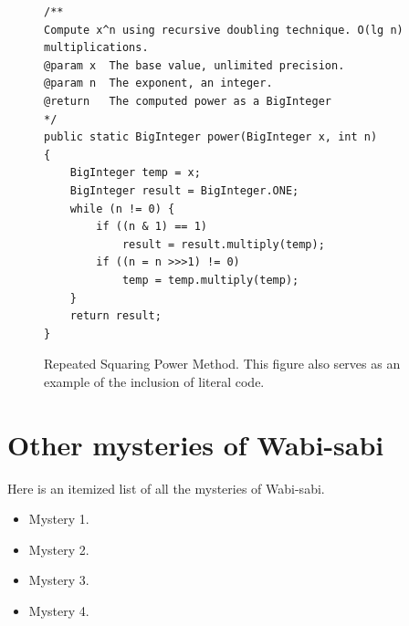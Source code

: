 \documentclass[dissertation, proposal]{bsu-cs}  %
\begin{document}
\begin{figure}[t]

\begin{vcode}  
\begin{lstlisting}
/**
Compute x^n using recursive doubling technique. O(lg n) multiplications.
@param x  The base value, unlimited precision.
@param n  The exponent, an integer.
@return   The computed power as a BigInteger
*/
public static BigInteger power(BigInteger x, int n)
{
    BigInteger temp = x;
    BigInteger result = BigInteger.ONE;
	while (n != 0) {
        if ((n & 1) == 1) 
            result = result.multiply(temp);
		if ((n = n >>>1) != 0)
           	temp = temp.multiply(temp);
    }
    return result;
}
\end{lstlisting}
\end{vcode}
\caption[Repeated Squaring Power Method]{Repeated Squaring Power Method. This figure
also serves as an example of the inclusion of literal code.}
%
\label{fig:code} 
\end{figure}


\section{Other mysteries of Wabi-sabi}

Here is an itemized list of all the mysteries of Wabi-sabi.
\begin{itemize}
\item Mystery 1.
\item Mystery 2.
\item Mystery 3.
\item Mystery 4.
\end{itemize}

\end{document}
